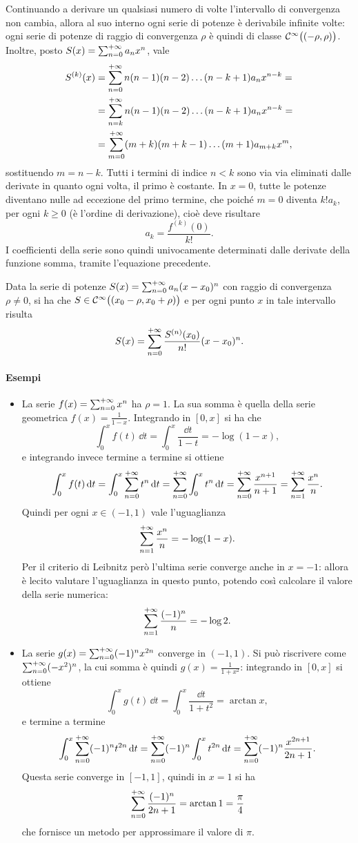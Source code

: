 Continuando a derivare un qualsiasi numero di volte l'intervallo di convergenza non cambia, allora al suo interno ogni serie di potenze è derivabile infinite volte: ogni serie di potenze di raggio di convergenza $\rho$ è quindi di classe $\mathcal{C}^{{\infty}}\big((-\rho,\rho)\big)$. Inoltre, posto $S(x)=\sum_{{n}=0}^{+\infty}a_nx^n$, vale
\[\begin{split}
S^{(k)}(x)	&=\sum_{{n}=0}^{+\infty}n(n-1)(n-2)\dots(n-k+1)a_nx^{n-k}=\\
			&=\sum_{n=k}^{+\infty}n(n-1)(n-2)\dots(n-k+1)a_nx^{n-k}=\\
			&=\sum_{{m}=0}^{+\infty}(m+k)(m+k-1)\dots(m+1)a_{m+k}x^m,
\end{split}\]
sostituendo $m=n-k$. Tutti i termini di indice $n<k$ sono via via eliminati dalle derivate in quanto ogni volta, il primo è costante.
In $x=0$, tutte le potenze diventano nulle ad eccezione del primo termine, che poiché $m=0$ diventa $k!a_k$, per ogni $k\geq 0$ (è l'ordine di derivazione), cioè deve risultare
\[
a_k=\frac{f^{(k)}(0)}{k!}.
\]
I coefficienti della serie sono quindi univocamente determinati dalle derivate della funzione somma, tramite l'equazione precedente.
\begin{teorema}
	Data la serie di potenze $S(x)=\sum_{{n}=0}^{+\infty}a_n(x-x_0)^n$ con raggio di convergenza $\rho\ne 0$, si ha che $S\in\mathcal{C}^{{\infty}}\big((x_0-\rho,x_0+\rho)\big)$ e per ogni punto $x$ in tale intervallo risulta
	\begin{equation} \label{eq:serie_potenze_taylor}
		S(x)=\sum_{{n}=0}^{+\infty}\frac{S^{(n)}(x_0)}{n!}(x-x_0)^n.
	\end{equation}
\end{teorema}
\paragraph{Esempi}
\begin{itemize}
\item La serie $f(x)=\sum_{{n}=0}^{+\infty}x^n$ ha $\rho=1$. La sua somma è quella della serie geometrica $f(x)=\frac1{1-x}$. Integrando in $[0,x]$ si ha che
\[
\int_0^xf(t)\,\dd t=\int_0^x\frac{\dd t}{1-t}=-\log(1-x),
\]
e integrando invece termine a termine si ottiene
\[
\int_0^xf(t)\,\textup{d} t=\int_0^x\sum_{{n}=0}^{+\infty}t^n\,\textup{d} t=\sum_{{n}=0}^{+\infty}\int_0^xt^n\,\textup{d} t=\sum_{{n}=0}^{+\infty}\frac{x^{n+1}}{n+1}=\sum_{{n}=1}^{+\infty}\frac{x^n}{n}.
\]
Quindi per ogni $x\in(-1,1)$ vale l'uguaglianza
\[
\sum_{{n}=1}^{+\infty}\frac{x^n}{n}=-\log(1-x).
\]
Per il criterio di Leibnitz però l'ultima serie converge anche in $x=-1$: allora è lecito valutare l'uguaglianza in questo punto, potendo così calcolare il valore della serie numerica:
\[
\sum_{{n}=1}^{+\infty}\frac{(-1)^n}{n}=-\log 2.
\]
\item La serie $g(x)=\sum_{{n}=0}^{+\infty}(-1)^nx^{2n}$ converge in $(-1,1)$. Si può riscrivere come $\sum_{{n}=0}^{+\infty}(-x^2)^n$, la cui somma è quindi $g(x)=\frac1{1+x^2}$: integrando in $[0,x]$ si ottiene
\[
\int_0^xg(t)\,\dd t=\int_0^x\frac{\dd t}{1+t^2}=\arctan x,
\]
e termine a termine
\[
\int_0^x\sum_{{n}=0}^{+\infty}(-1)^nt^{2n}\,\textup{d} t=\sum_{{n}=0}^{+\infty}(-1)^n\int_0^xt^{2n}\,\textup{d} t=\sum_{{n}=0}^{+\infty}(-1)^n\frac{x^{2n+1}}{2n+1}.
\]
Questa serie converge in $[-1,1]$, quindi in $x=1$ si ha
\[
\sum_{{n}=0}^{+\infty}\frac{(-1)^n}{2n+1}=\arctan 1=\frac{\pi}4
\]
che fornisce un metodo per approssimare il valore di $\pi$.
\end{itemize}

